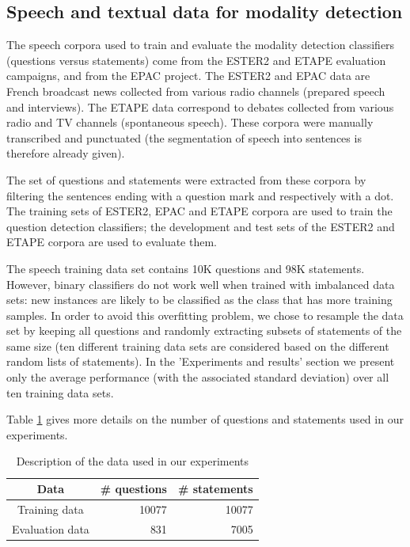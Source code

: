 \documentclass[runningheads,a4paper]{llncs}
\begin{document}
\subsection{Speech and textual data for modality detection}\label{data}

The speech corpora used to train and evaluate the modality detection classifiers (questions versus statements)  come from the ESTER2 \cite{Galliano:2009} and ETAPE \cite{gravier:2012} evaluation campaigns, and from the EPAC \cite{ESTEVE:2010} project.
The ESTER2 and EPAC data are French broadcast news collected from various radio channels (prepared speech and interviews).
The ETAPE data correspond to debates collected from various radio and TV channels (spontaneous speech).
These corpora were manually transcribed and punctuated (the segmentation of speech into sentences is therefore already given).

The set of questions and statements were extracted from these corpora by filtering the sentences ending with a question mark and respectively with a dot.
The training sets of ESTER2, EPAC and ETAPE corpora are used to train the question detection classifiers; the development and test sets of the ESTER2 and ETAPE corpora are used to evaluate them.

The speech training data set contains 10K questions and 98K statements.
However, binary classifiers do not work well when trained with imbalanced data sets: new instances are likely to be classified as the class that has more training samples.
In order to avoid this overfitting problem, we chose to resample the data set by keeping all questions and randomly extracting subsets of statements of the same size (ten different training data sets are considered based on the different random lists of statements).
In the 'Experiments and results' section we present only the average performance (with the associated standard deviation) over all ten training data sets.

Table \ref{Tab:usedData} gives more details on the number of questions and statements used in our experiments.

\begin{table}
\caption{Description of the data used in our experiments }
\label{Tab:usedData}
\centering
\begin{tabular}{|c|r|r|}
\hline
{\bf Data}  & {\bf \# questions}  & {\bf \# statements} 	\\ \hline%
Training data 	& 10077 & 10077  \\ \hline
Evaluation data &   831 &  7005  \\ \hline
\end{tabular}
\end{table}
\end{document}
